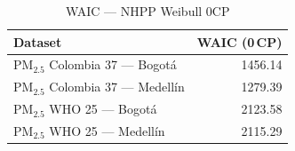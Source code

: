 \begin{table}[htbp]
\centering
\caption{WAIC --- NHPP Weibull 0CP}
\label{tab:nhpp_waic_0cp}
\begin{tabular}{lr}
\toprule
Dataset & WAIC (0\,CP) \\
\midrule
PM$_{2.5}$ Colombia 37 --- Bogot\'{a} & 1456.14 \\
PM$_{2.5}$ Colombia 37 --- Medell\'{i}n & 1279.39 \\
PM$_{2.5}$ WHO 25 --- Bogot\'{a} & 2123.58 \\
PM$_{2.5}$ WHO 25 --- Medell\'{i}n & 2115.29 \\
\bottomrule
\end{tabular}
\end{table}
